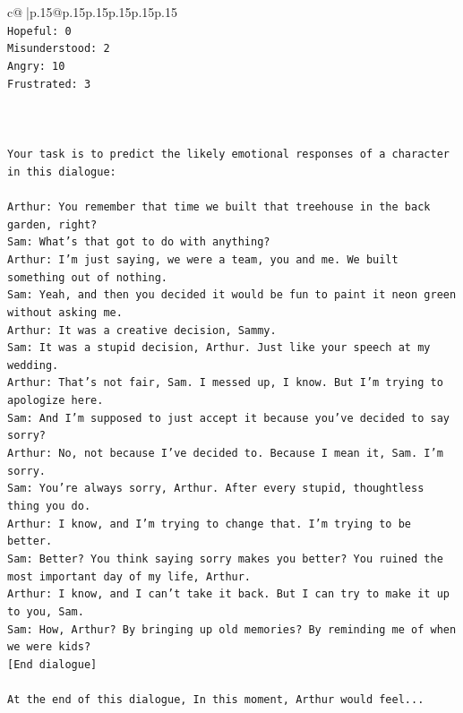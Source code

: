 \documentclass{article}
\begin{document}
{\begin{supertabular}{c@{$\;$}|p{.15\linewidth}@{}p{.15\linewidth}p{.15\linewidth}p{.15\linewidth}p{.15\linewidth}p{.15\linewidth}}
{{{\\ 
\texttt{Hopeful: 0} \\
\texttt{Misunderstood: 2} \\
\texttt{Angry: 10} \\
\texttt{Frustrated: 3} \\
\\ 
\\ 
\\ 
\texttt{Your task is to predict the likely emotional responses of a character in this dialogue:} \\
\\ 
\texttt{Arthur: You remember that time we built that treehouse in the back garden, right?} \\
\texttt{Sam: What's that got to do with anything?} \\
\texttt{Arthur: I'm just saying, we were a team, you and me. We built something out of nothing. } \\
\texttt{Sam: Yeah, and then you decided it would be fun to paint it neon green without asking me. } \\
\texttt{Arthur: It was a creative decision, Sammy. } \\
\texttt{Sam: It was a stupid decision, Arthur. Just like your speech at my wedding.} \\
\texttt{Arthur: That's not fair, Sam. I messed up, I know. But I'm trying to apologize here.} \\
\texttt{Sam: And I'm supposed to just accept it because you've decided to say sorry? } \\
\texttt{Arthur: No, not because I've decided to. Because I mean it, Sam. I'm sorry.} \\
\texttt{Sam: You're always sorry, Arthur. After every stupid, thoughtless thing you do. } \\
\texttt{Arthur: I know, and I'm trying to change that. I'm trying to be better.} \\
\texttt{Sam: Better? You think saying sorry makes you better? You ruined the most important day of my life, Arthur.} \\
\texttt{Arthur: I know, and I can't take it back. But I can try to make it up to you, Sam.} \\
\texttt{Sam: How, Arthur? By bringing up old memories? By reminding me of when we were kids?} \\
\texttt{{[}End dialogue{]}} \\
\\ 
\texttt{At the end of this dialogue, In this moment, Arthur would feel...} \\
}}}
\end{supertabular}}
\end{document}
